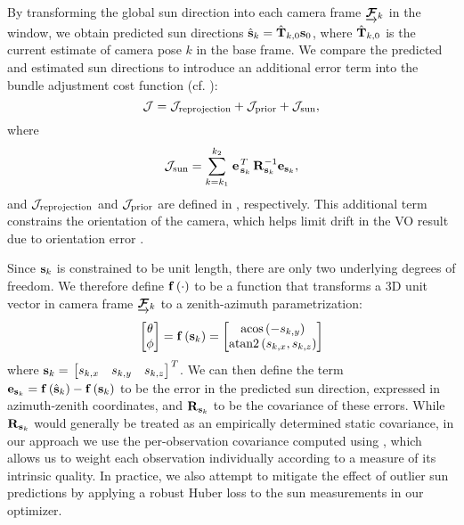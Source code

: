 By transforming the global sun direction into each camera frame $\underrightarrow{ \boldsymbol{\mathbf{\mathcal{F}}} }_{k}$ in the window, we obtain predicted sun directions $\hat{\boldsymbol{\mathbf{s}}}_k = \hat{\boldsymbol{\mathbf{T}}}_{k,0} \boldsymbol{\mathbf{s}}_0$, where $\hat{\boldsymbol{\mathbf{T}}}_{k,0}$ is the current estimate of camera pose $k$ in the base frame. 
We compare the predicted and estimated sun directions to introduce an additional error term into the bundle adjustment cost function (cf. ):
\begin{equation} \label{eq:cost_function_with_sun}
    \mathcal{J} = \mathcal{J}_\text{reprojection} + \mathcal{J}_\text{prior} + \mathcal{J}_\text{sun},
\end{equation}
where 
\begin{equation} \label{eq:sun_cost}
	\mathcal{J}_\text{sun} = \sum_{k=k_1}^{k_2} \left.{\boldsymbol{\mathbf{e}}}\right.^T_{\boldsymbol{\mathbf{s}}_k} \boldsymbol{\mathbf{R}}^{-1}_{\boldsymbol{\mathbf{s}}_k} \boldsymbol{\mathbf{e}}_{\boldsymbol{\mathbf{s}}_k},
\end{equation}
and $\mathcal{J}_\text{reprojection}$ and $\mathcal{J}_\text{prior}$ are defined in , respectively.
This additional term constrains the orientation of the camera, which helps limit drift in the VO result due to orientation error \citep{Lambert2012-sn}.

Since $\boldsymbol{\mathbf{s}}_k$ is constrained to be unit length, there are only two underlying degrees of freedom.
We therefore define $\boldsymbol{\mathbf{f}}\left(\cdot\right)$ to be a function that transforms a 3D unit vector in camera frame $\underrightarrow{ \boldsymbol{\mathbf{\mathcal{F}}} }_{k}$ to a zenith-azimuth parametrization:
\begin{equation} \label{eq:vec-to-az-zen}
	\begin{bmatrix} \theta \\ \phi \end{bmatrix}
    = \boldsymbol{\mathbf{f}} \left( \boldsymbol{\mathbf{s}}_k \right)
    = \begin{bmatrix} \text{acos}\left( -s_{k,y} \right) \\ \text{atan2}\left(s_{k,x}, s_{k,z} \right) \end{bmatrix}
\end{equation}
where $\boldsymbol{\mathbf{s}}_k = \left.{\begin{bmatrix} s_{k,x} & s_{k,y} & s_{k,z} \end{bmatrix}}\right.^T$.
We can then define the term $\boldsymbol{\mathbf{e}}_{\boldsymbol{\mathbf{s}}_k} = \boldsymbol{\mathbf{f}}\left(\hat{\boldsymbol{\mathbf{s}}}_k\right) - \boldsymbol{\mathbf{f}}\left(\boldsymbol{\mathbf{s}}_k\right)$ to be the error in the predicted sun direction, expressed in azimuth-zenith coordinates, and $\boldsymbol{\mathbf{R}}_{\boldsymbol{\mathbf{s}}_k}$ to be the covariance of these errors.
While $\boldsymbol{\mathbf{R}}_{\boldsymbol{\mathbf{s}}_k}$ would generally be treated as an empirically determined static covariance, in our approach we use the per-observation covariance computed using , which allows us to weight each observation individually according to a measure of its intrinsic quality.
In practice, we also attempt to mitigate the effect of outlier sun predictions by applying a robust Huber loss to the sun measurements in our optimizer.


